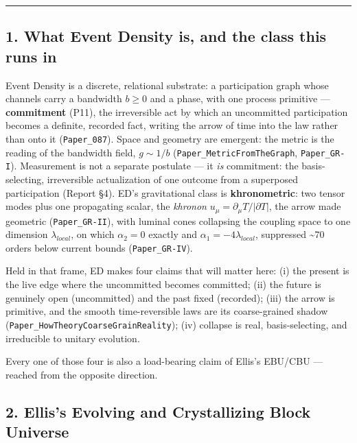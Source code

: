 \documentclass[
  11pt,
]{article}
\begin{document}
\begin{center}\rule{0.5\linewidth}{0.5pt}\end{center}

\subsection{1. What Event Density is, and the class this runs
in}\label{what-event-density-is-and-the-class-this-runs-in}

Event Density is a discrete, relational substrate: a participation graph
whose channels carry a bandwidth \(b \ge 0\) and a phase, with one
process primitive --- \textbf{commitment} (P11), the irreversible act by
which an uncommitted participation becomes a definite, recorded fact,
writing the arrow of time into the law rather than onto it
(\texttt{Paper\_087}). Space and geometry are emergent: the metric is
the reading of the bandwidth field, \(g \sim 1/b\)
(\texttt{Paper\_MetricFromTheGraph}, \texttt{Paper\_GR-I}). Measurement
is not a separate postulate --- it \emph{is} commitment: the
basis-selecting, irreversible actualization of one outcome from a
superposed participation (Report §4). ED's gravitational class is
\textbf{khronometric}: two tensor modes plus one propagating scalar, the
\emph{khronon} \(u_\mu = \partial_\mu T/|\partial T|\), the arrow made
geometric (\texttt{Paper\_GR-II}), with luminal cones collapsing the
coupling space to one dimension \(\lambda_{local}\), on which
\(\alpha_{2} = 0\) exactly and \(\alpha_{1} = -4\lambda_{local}\),
suppressed \textasciitilde70 orders below current bounds
(\texttt{Paper\_GR-IV}).

Held in that frame, ED makes four claims that will matter here: (i) the
present is the live edge where the uncommitted becomes committed; (ii)
the future is genuinely open (uncommitted) and the past fixed
(recorded); (iii) the arrow is primitive, and the smooth time-reversible
laws are its coarse-grained shadow
(\texttt{Paper\_HowTheoryCoarseGrainReality}); (iv) collapse is real,
basis-selecting, and irreducible to unitary evolution.

Every one of those four is also a load-bearing claim of Ellis's EBU/CBU
--- reached from the opposite direction.

\subsection{2. Ellis's Evolving and Crystallizing Block
Universe}\label{elliss-evolving-and-crystallizing-block-universe}
\end{document}

